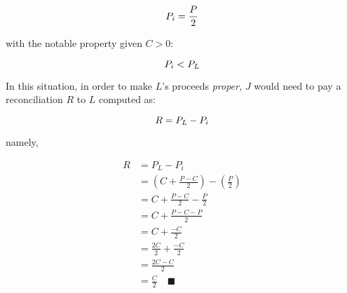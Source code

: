 \documentclass[10pt,letterpaper,oneside]{article}
\begin{document}
\begin{equation}
P_i = \frac{P}{2}       \\[10pt]
\end{equation}

\noindent
with the notable property given $C>0$:

\begin{equation}
P_i < P_L       \\[10pt]
\end{equation}

\noindent
In this situation, in order to make $L$'s proceeds \emph{proper,} $J$ would need to pay a reconciliation $R$ to $L$ computed as:

\begin{equation}
R = P_L - P_i       \\[10pt]
\end{equation}

\noindent
namely,

\begin{align*}
R &= P_L - P_i                                                      \\[10pt]
&= \left( C + \frac{P-C}{2} \right) - \left(\frac{P}{2}\right)      \\[10pt]
&= C + \frac{P-C}{2} - \frac{P}{2}                                  \\[10pt]
&= C + \frac{P-C-P}{2}                                              \\[10pt]
&= C + \frac{-C}{2}                                                 \\[10pt]
&= \frac{2C}{2} + \frac{-C}{2}                                      \\[10pt]
&= \frac{2C-C}{2}                                                   \\[10pt]
&= \frac{C}{2}      \quad\blacksquare                               \\[10pt]
\end{align*}
\end{document}
